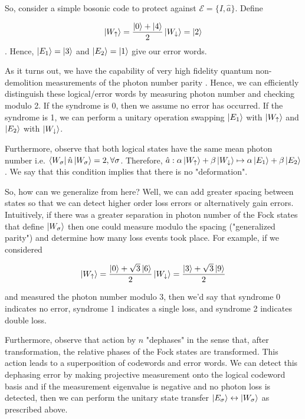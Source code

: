 \documentclass[12]{amsart}
\newcommand\0{\mathbf{0}}
\newcommand\<{\langle}
\renewcommand\>{\rangle}
\begin{document}
So, consider a simple bosonic code to protect against $\mathcal{E} = \{ I, \hat{a} \}$. Define 

$$
\ket{W_\uparrow} = \frac{\ket{0} + \ket{4}}{2}\\
\ket{W_\downarrow} = \ket{2}
$$. Hence, $\ket{E_1} = \ket{3}$ and $\ket{E_2} = \ket{1}$ give our error words. 

As it turns out, we have the capability of very high fidelity quantum non-demolition measurements of the photon number parity \cite{sun2014tracking}. Hence, we can efficiently distinguish these logical/error words by measuring photon number and checking modulo 2. If the syndrome is 0, then we assume no error has occurred. If the syndrome is 1, we can perform a unitary operation swapping $\ket{E_1}$ with $\ket{W_\uparrow}$ and $\ket{E_2}$ with $\ket{W_\downarrow}$.

Furthermore, observe that both logical states have the same mean photon number i.e. $\bra{W_\sigma} \hat{n} \ket{W_\sigma} = 2, \forall \sigma$. Therefore, $\hat{a} : \alpha\ket{W_\uparrow} + \beta\ket{W_\downarrow} \mapsto \alpha \ket{E_1} + \beta \ket{E_2}$. We say that this condition implies that there is no "deformation".

So, how can we generalize from here? Well, we can add greater spacing between states so that we can detect higher order loss errors or alternatively gain errors. Intuitively, if there was a greater separation in photon number of the Fock states that define $\ket{W_\sigma}$ then one could measure modulo the spacing ("generalized parity") and determine how many loss events took place. For example, if we considered

$$
\ket{W_\uparrow} = \frac{\ket{0} + \sqrt{3}\ket{6}}{2}\\
\ket{W_\downarrow} = \frac{\ket{3} + \sqrt{3}\ket{9}}{2}
$$

and measured the photon number modulo 3, then we'd say that syndrome 0 indicates no error, syndrome 1 indicates a single loss, and syndrome 2 indicates double loss.

 Furthermore, observe that action by $n$ "dephases" in the sense that, after transformation, the relative phases of the Fock states are transformed. This action leads to a superposition of codewords and error words. We can detect this dephasing error by making projective measurement onto the logical codeword basis and if the measurement eigenvalue is negative and no photon loss is detected, then we can perform the unitary state transfer $\ket{E_\sigma} \leftrightarrow \ket{W_\sigma}$ as prescribed above.
 
\end{document}
